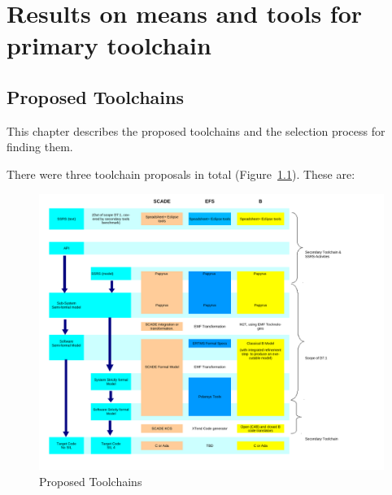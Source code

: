 \chapter{Results on means and tools for primary toolchain}
\label{sec:results}

\section{Proposed Toolchains}

This chapter describes the proposed toolchains and the selection process for finding them.

There were three toolchain proposals in total (Figure~\ref{fig:proposals}).  These are:

 \begin{figure}[b!]
  \centering
  \includegraphics[width=\linewidth]{images/compare-toolchains.pdf}
  \caption{Proposed Toolchains}
  \label{fig:proposals}
\end{figure}

